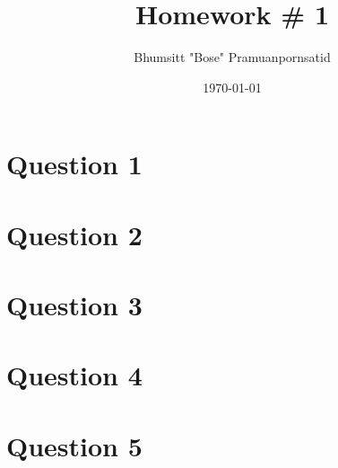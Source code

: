 \documentclass{report}
\title{Homework \# 1}
\author{Bhumsitt "Bose" Pramuanpornsatid}
\date{\today}
\begin{document}
\maketitle

\section*{Question 1}


\newpage

\section*{Question 2}

\newpage

\section*{Question 3}


\newpage

\section*{Question 4}


\newpage

\section*{Question 5}
\end{document}
